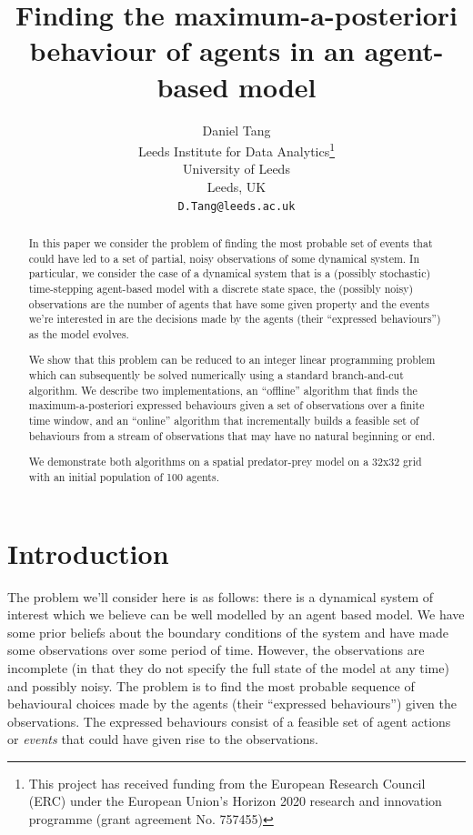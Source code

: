 \documentclass{article}
\title{Finding the maximum-a-posteriori behaviour of agents in an agent-based model}
\author{
  Daniel Tang\\
  Leeds Institute for Data Analytics\thanks{This project has received funding from the European Research Council (ERC) under the European Union’s Horizon 2020 research and innovation programme (grant agreement No. 757455)}\\
  University of Leeds\\
  Leeds, UK\\
  \texttt{D.Tang@leeds.ac.uk} \\
}
\begin{document}
\maketitle

\begin{abstract}
In this paper we consider the problem of finding the most probable set of events that could have led to a set of partial, noisy observations of some dynamical system. In particular, we consider the case of a dynamical system that is a (possibly stochastic) time-stepping agent-based model with a discrete state space, the (possibly noisy) observations are the number of agents that have some given property and the events we're interested in are the decisions made by the agents (their ``expressed behaviours'') as the model evolves.

We show that this problem can be reduced to an integer linear programming problem which can subsequently be solved numerically using a standard branch-and-cut algorithm. We describe two implementations, an ``offline'' algorithm that finds the maximum-a-posteriori expressed behaviours given a set of observations over a finite time window, and an ``online'' algorithm that incrementally builds a feasible set of behaviours from a stream of observations that may have no natural beginning or end.

We demonstrate both algorithms on a spatial predator-prey model on a 32x32 grid with an initial population of 100 agents.
\end{abstract}


\section{Introduction}

The problem we'll consider here is as follows: there is a dynamical system of interest which we believe can be well modelled by an agent based model. We have some prior beliefs about the boundary conditions of the system and have made some observations over some period of time. However, the observations are incomplete (in that they do not specify the full state of the model at any time) and possibly noisy. The problem is to find the most probable sequence of behavioural choices made by the agents (their ``expressed behaviours'') given the observations. The expressed behaviours consist of a feasible set of agent actions or \textit{events} that could have given rise to the observations.
\end{document}
